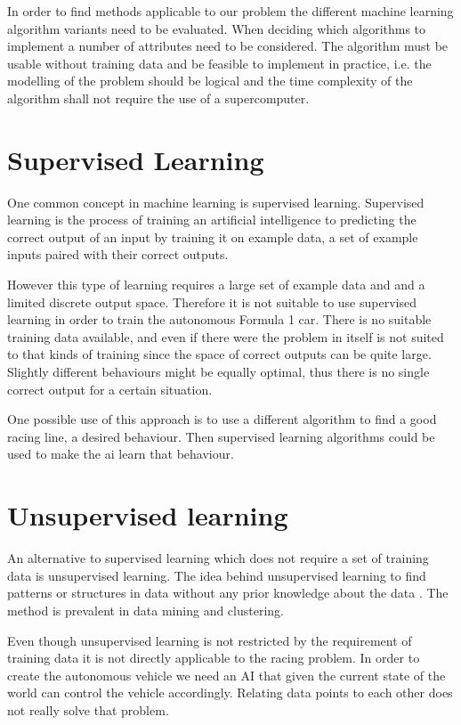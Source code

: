 In order to find methods applicable to our problem the different machine learning algorithm variants need to be evaluated. When deciding which algorithms to implement a number of attributes need to be considered. The algorithm must be usable without training data and be feasible to implement in practice, i.e. the modelling of the problem should be logical and the time complexity of the algorithm shall not require the use of a supercomputer.

\section{Supervised Learning}
One common concept in machine learning is supervised learning. Supervised learning is the process of training an artificial intelligence to predicting the correct output of an input by training it on example data, a set of example inputs paired with their correct outputs.\cite{barber}

However this type of learning requires a large set of example data and and a limited discrete output space. Therefore it is not suitable to use supervised learning in order to train the autonomous Formula 1 car. There is no suitable training data available, and even if there were the problem in itself is not suited to that kinds of training since the space of correct outputs can be quite large. Slightly different behaviours might be equally optimal, thus there is no single correct output for a certain situation.  

One possible use of this approach is to use a different algorithm to find a good racing line, a desired behaviour. Then supervised learning algorithms could be used to make the ai learn that behaviour.

\section{Unsupervised learning}
An alternative to supervised learning which does not require a set of training data is unsupervised learning. The idea behind unsupervised learning to find patterns or structures in data without any prior knowledge about the data \cite{glossary}. The method is prevalent in data mining and clustering. 

Even though unsupervised learning is not restricted by the requirement of training data it is not directly applicable to the racing problem. In order to create the autonomous vehicle we need an AI that given the current state of the world can control the vehicle accordingly. Relating data points to each other does not really solve that problem.

